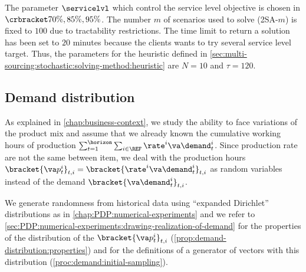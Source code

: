 The parameter $\servicelvl$ which control the service level objective is chosen in $\crbracket{70\%,85\%,95\%}$.
The number $m$ of scenarios used to solve (2SA-$m$) is fixed to $100$ due to tractability restrictions.
The time limit to return a solution has been set to $20$ minutes because the clients wants to try several service level target.
Thus, the parameters for the heuristic defined in \cref{sec:multi-sourcing:stochastic:solving-method:heuristic} are $N=10$ and $\tau=120$.






\subsection{Demand distribution}
\label{sec:multi-sourcing:numerical-experiments:demand-distribution}




As explained in \cref{chap:business-context}, we study the ability to face variations of the product mix and assume that we already known the cumulative working hours of production $\sum_{t=1}^{\horizon}\sum_{i\in\REF}\rate^i\va\demand_t^i$.
Since production rate are not the same between item, we deal with the production hours $\bracket{\va p_t^i}_{t,i}=\bracket{\rate^i\va\demand_t^i}_{t,i}$ as random variables instead of the demand $\bracket{\va\demand_t^i}_{t,i}$.


We generate randomness from historical data using ``expanded Dirichlet'' distributions as in \cref{chap:PDP:numerical-experiments} and we refer to \cref{sec:PDP:numerical-experiments:drawing-realization-of-demand} for the properties of the distribution of the $\bracket{\va p_t^i}_{t,i}$ (\cref{prop:demand-distribution:properties}) and for the definitions of a generator of vectors with this distribution (\cref{proc:demand:initial-sampling}).


